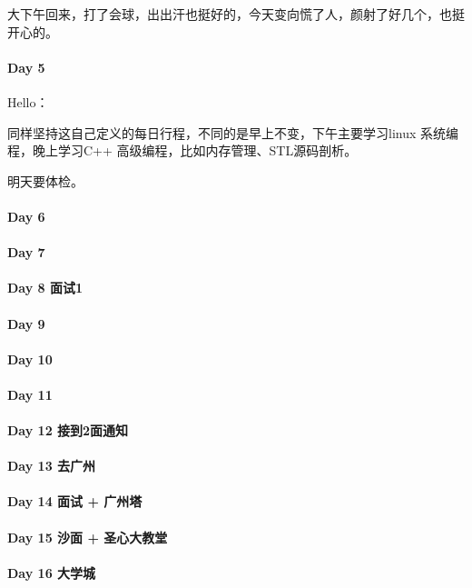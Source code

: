 \documentclass[UTF8,a4paper,8pt]{ctexart}
\begin{document}
 	 	大下午回来，打了会球，出出汗也挺好的，今天变向慌了人，颜射了好几个，也挺开心的。
 	 \paragraph{Day 5       \quad     }
 	 	Hello：
 	 	
 	 	同样坚持这自己定义的每日行程，不同的是早上不变，下午主要学习linux 系统编程，晚上学习C++ 高级编程，比如内存管理、STL源码剖析。
 	 	
 	 	明天要体检。
 	 \paragraph{Day 6       \quad     }
 	 \paragraph{Day 7       \quad     }
 	 \paragraph{Day 8  面试1     \quad     }
 	 \paragraph{Day 9       \quad     }
 	 \paragraph{Day 10      \quad     }
 	 \paragraph{Day 11      \quad     }
 	 \paragraph{Day 12  接到2面通知    \quad     }
 	 \paragraph{Day 13  去广州    \quad     }
 	 \paragraph{Day 14  面试 + 广州塔   \quad     }
 	 \paragraph{Day 15  沙面 + 圣心大教堂    \quad     }
 	 \paragraph{Day 16   大学城   \quad     }
\end{document}
